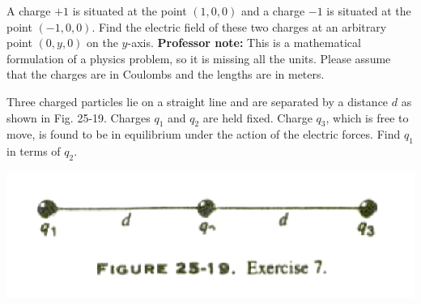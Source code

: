\documentclass[11pt,letterpaper,boxed]{hmcpset}
\begin{document}
	\begin{solution}
		\vfill
	\end{solution}
	\newpage
	
	
	\begin{problem}[Schey I-5]
		A charge $+1$ is situated at the point $(1,0,0)$ and a charge $-1$ is situated at the point $(-1,0,0)$. Find the electric field of these two charges at an arbitrary point $(0,y,0)$ on the $y$-axis.
		\linebreak
		\newline
		\textbf{Professor note:} This is a mathematical formulation of a physics problem, so it is missing all the units. Please assume that the charges are in Coulombs and the lengths are in meters. 
			
	\end{problem}
	
	\begin{solution}
		\vfill
	\end{solution}
	\newpage
	
	
	\begin{problem}[HRK E25.7*]
		Three charged particles lie on a straight line and are separated by a distance $d$ as shown in Fig. 25-19. Charges $q_1$ and $q_2$ are held fixed. Charge $q_3$, which is free to move, is found to be in equilibrium under the action of the electric forces. Find $q_1$ in terms of $q_2$.
		
		\begin{center}
			\includegraphics[scale=0.5]{25-19.png}
		\end{center}
		
	\end{problem}
	
	\begin{solution}
		\vfill
	\end{solution}
	\newpage
	
\end{document}
